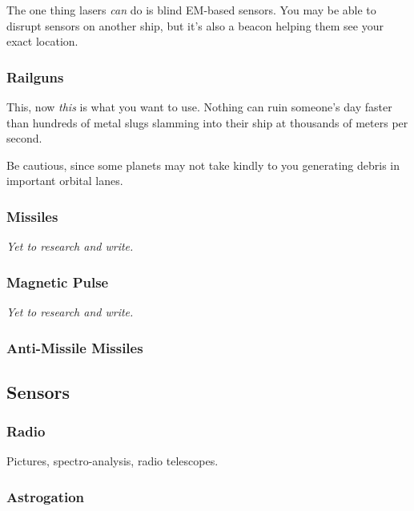 \par
The one thing lasers \textit{can} do is blind EM-based sensors. You may be able to disrupt sensors on another ship, but it's also a beacon helping them see your exact location.


\subsubsection{Railguns}
\par
This, now \textit{this} is what you want to use. Nothing can ruin someone's day faster than hundreds of metal slugs slamming into their ship at thousands of meters per second.

\par
Be cautious, since some planets may not take kindly to you generating debris in important orbital lanes.


\subsubsection{Missiles}

\textit{Yet to research and write.}

\subsubsection{Magnetic Pulse}

\textit{Yet to research and write.}

\subsubsection{Anti-Missile Missiles}

\subsection{Sensors}

\subsubsection{Radio}
Pictures, spectro-analysis, radio telescopes.

\subsubsection{Astrogation}

